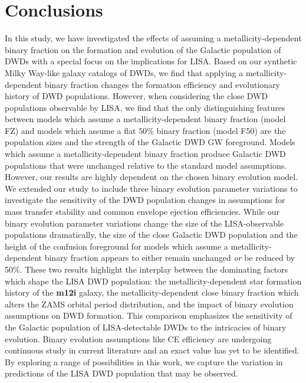 \documentclass[twocolumn]{aastex631}
\begin{document}
\section{Conclusions}\label{sec:conclusions}
In this study, we have investigated the effects of assuming a metallicity-dependent binary fraction on the formation and evolution of the Galactic population of DWDs with a special focus on the implications for LISA. Based on our synthetic Milky Way-like galaxy catalogs of DWDs, we find that applying a metallicity-dependent binary fraction changes the formation efficiency and evolutionary history of DWD populations. However, when considering the close DWD populations observable by LISA, we find that the only distinguishing features between models which assume a metallicity-dependent binary fraction (model FZ) and models which assume a flat $50\%$ binary fraction (model F50) are the population sizes and the strength of the Galactic DWD GW foreground. Models which assume a metallicity-dependent binary fraction produce Galactic DWD populations that were unchanged relative to the standard model assumptions. However, our results are highly dependent on the chosen binary evolution model. We extended our study to include three binary evolution parameter variations to investigate the sensitivity of the DWD population changes in assumptions for mass transfer stability and common envelope ejection efficiencies. While our binary evolution parameter variations change the size of the LISA-observable populations dramatically, the size of the close Galactic DWD population and the height of the confusion foreground for models which assume a metallicity-dependent binary fraction appears to either remain unchanged \emph{or} be reduced by 50\%. These two results highlight the interplay between the dominating factors which shape the LISA DWD population: the metallicity-dependent star formation history of the \textbf{m12i} galaxy, the metallicity-dependent close binary fraction which alters the ZAMS orbital period distribution, and the impact of binary evolution assumptions on DWD formation. This comparison emphasizes the sensitivity of the Galactic population of LISA-detectable DWDs to the intricacies of binary evolution. Binary evolution assumptions like CE efficiency are undergoing continuous study in current literature and an exact value has yet to be identified. By exploring a range of possibilities in this work, we capture the variation in predictions of the LISA DWD population that may be observed.
\end{document}
